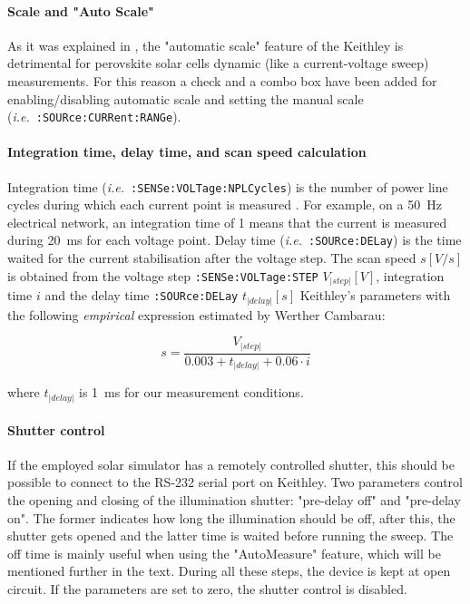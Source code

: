		\paragraph{Scale and "Auto Scale"}
		As it was explained in , the "automatic scale" feature of the Keithley is detrimental for perovskite solar cells dynamic (like a current\hyp{}voltage sweep) measurements.
		For this reason a check and a combo box have been added for enabling\-/disabling automatic scale and setting the manual scale (\textsl{i.e.}\ \texttt{:SOURce:\-CURRent:\-RANGe}).
		
		\paragraph{Integration time, delay time, and scan speed calculation}
		Integration time (\textsl{i.e.}\ \texttt{:SENSe:\-VOLTage:\-NPLCycles}) is the number of power line cycles during which each current point is measured \cite{KeithleyInstruments2011}.
		For example, on a \SI{50}{\Hz} electrical network, an integration time of 1 means that the current is measured during \SI{20}{\ms} for each voltage point.
		Delay time (\textsl{i.e.}\ \texttt{:SOURce:\-DELay}) is the time waited for the current stabilisation after the voltage step.
The scan speed $s[V/s]$ is obtained from the voltage step \texttt{:SENSe:\-VOLTage:\-STEP} $V_|step|[V]$, integration time $i$ and the delay time \texttt{:SOURce:\-DELay} $t_|delay|[s]$ Keithley's parameters with the following \textit{empirical} expression estimated by Werther Cambarau:

\begin{equation}
s = \frac{V_|step|}{0.003 + t_|delay| + 0.06 \cdot i}
\end{equation}

where $t_|delay|$ is \SI{1}{\ms} for our measurement conditions.

\paragraph{Shutter control}
If the employed solar simulator has a remotely controlled shutter, this should be possible to connect to the RS-232 serial port on Keithley.
Two parameters control the opening and closing of the illumination shutter: "pre-delay off" and "pre-delay on".
The former indicates how long the illumination should be off, after this, the shutter gets opened and the latter time is waited before running the sweep.
The off time is mainly useful when using the "AutoMeasure" feature, which will be mentioned further in the text.
During all these steps, the device is kept at open circuit.
If the parameters are set to zero, the shutter control is disabled.

